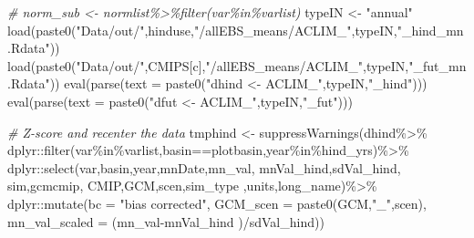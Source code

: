 \documentclass[
]{article}
\newenvironment{Shaded}{\begin{snugshade}}{\end{snugshade}}
\newcommand{\AttributeTok}[1]{\textcolor[rgb]{0.77,0.63,0.00}{#1}}
\newcommand{\CommentTok}[1]{\textcolor[rgb]{0.56,0.35,0.01}{\textit{#1}}}
\newcommand{\FunctionTok}[1]{\textcolor[rgb]{0.00,0.00,0.00}{#1}}
\newcommand{\NormalTok}[1]{#1}
\newcommand{\OtherTok}[1]{\textcolor[rgb]{0.56,0.35,0.01}{#1}}
\newcommand{\SpecialCharTok}[1]{\textcolor[rgb]{0.00,0.00,0.00}{#1}}
\newcommand{\StringTok}[1]{\textcolor[rgb]{0.31,0.60,0.02}{#1}}
\begin{document}
\begin{Shaded}
\begin{Highlighting}[]
      \CommentTok{\# norm\_sub \textless{}{-} normlist\%\textgreater{}\%filter(var\%in\%varlist)}
\NormalTok{        typeIN }\OtherTok{\textless{}{-}} \StringTok{"annual"}
        \FunctionTok{load}\NormalTok{(}\FunctionTok{paste0}\NormalTok{(}\StringTok{"Data/out/"}\NormalTok{,hinduse,}\StringTok{"/allEBS\_means/ACLIM\_"}\NormalTok{,typeIN,}\StringTok{"\_hind\_mn.Rdata"}\NormalTok{))}
        \FunctionTok{load}\NormalTok{(}\FunctionTok{paste0}\NormalTok{(}\StringTok{"Data/out/"}\NormalTok{,CMIPS[c],}\StringTok{"/allEBS\_means/ACLIM\_"}\NormalTok{,typeIN,}\StringTok{"\_fut\_mn.Rdata"}\NormalTok{))}
        \FunctionTok{eval}\NormalTok{(}\FunctionTok{parse}\NormalTok{(}\AttributeTok{text =} \FunctionTok{paste0}\NormalTok{(}\StringTok{"dhind \textless{}{-} ACLIM\_"}\NormalTok{,typeIN,}\StringTok{"\_hind"}\NormalTok{)))}
        \FunctionTok{eval}\NormalTok{(}\FunctionTok{parse}\NormalTok{(}\AttributeTok{text =} \FunctionTok{paste0}\NormalTok{(}\StringTok{"dfut  \textless{}{-} ACLIM\_"}\NormalTok{,typeIN,}\StringTok{"\_fut"}\NormalTok{)))}
     
      \CommentTok{\# Z{-}score and recenter the data}
\NormalTok{       tmphind    }\OtherTok{\textless{}{-}} \FunctionTok{suppressWarnings}\NormalTok{(dhind}\SpecialCharTok{\%\textgreater{}\%}
\NormalTok{         dplyr}\SpecialCharTok{::}\FunctionTok{filter}\NormalTok{(var}\SpecialCharTok{\%in\%}\NormalTok{varlist,basin}\SpecialCharTok{==}\NormalTok{plotbasin,year}\SpecialCharTok{\%in\%}\NormalTok{hind\_yrs)}\SpecialCharTok{\%\textgreater{}\%}
\NormalTok{         dplyr}\SpecialCharTok{::}\FunctionTok{select}\NormalTok{(var,basin,year,mnDate,mn\_val,}
\NormalTok{                       mnVal\_hind,sdVal\_hind, sim,gcmcmip,}
\NormalTok{                       CMIP,GCM,scen,sim\_type ,units,long\_name)}\SpecialCharTok{\%\textgreater{}\%}
\NormalTok{         dplyr}\SpecialCharTok{::}\FunctionTok{mutate}\NormalTok{(}\AttributeTok{bc =} \StringTok{"bias corrected"}\NormalTok{,}
                       \AttributeTok{GCM\_scen =} \FunctionTok{paste0}\NormalTok{(GCM,}\StringTok{"\_"}\NormalTok{,scen),}
                       \AttributeTok{mn\_val\_scaled =}\NormalTok{  (mn\_val}\SpecialCharTok{{-}}\NormalTok{mnVal\_hind )}\SpecialCharTok{/}\NormalTok{sdVal\_hind))}
       

\end{Highlighting}
\end{Shaded}
\end{document}
